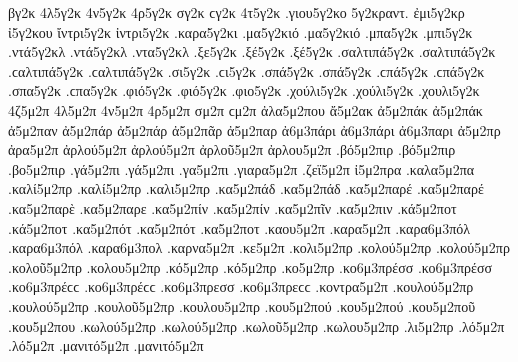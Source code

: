 {%
βγ2κ
4λ5γ2κ
4ν5γ2κ
4ρ5γ2κ
σγ2κ ϲγ2κ
4τ5γ2κ
.γιου5γ2κο   %
5γ2κραντ.   %
ἐμι5γ2κρ   %
ἰ5γ2κου   %
ἴντρι5γ2κ   %
ἰντρι5γ2κ
.καρα5γ2κι   %
.μα5γ2κιό .μα5γ2κιό   %
.μπα5γ2κ   %
.μπι5γ2κ   %
.ντά5γ2κλ .ντά5γ2κλ   %
.ντα5γ2κλ   %
.ξε5γ2κ   %
.ξέ5γ2κ .ξέ5γ2κ
.σαλτιπά5γ2κ .σαλτιπά5γ2κ .ϲαλτιπά5γ2κ .ϲαλτιπά5γ2κ   %
.σι5γ2κ .ϲι5γ2κ   %
.σπά5γ2κ .σπά5γ2κ .ϲπά5γ2κ .ϲπά5γ2κ   %
.σπα5γ2κ .ϲπα5γ2κ
.φιό5γ2κ .φιό5γ2κ   %
.φιο5γ2κ
.χούλι5γ2κ .χούλι5γ2κ   %
.χουλι5γ2κ
4ζ5μ2π
4λ5μ2π
4ν5μ2π
4ρ5μ2π
σμ2π ϲμ2π
ἀλα5μ2που   %
ἄ5μ2ακ   %
ἀ5μ2πάκ ἀ5μ2πάκ
ἀ5μ2παν   %
ἀ5μ2πάρ ἀ5μ2πάρ   %
ἀ5μ2πᾶρ
ἀ5μ2παρ
ἀ6μ3πάρι ἀ6μ3πάρι   %
ἀ6μ3παρι
ἀ5μ2πρ   %
ἀρα5μ2π   %
ἀρλού5μ2π ἀρλού5μ2π   %
ἀρλοῦ5μ2π
ἀρλου5μ2π
.βό5μ2πιρ .βό5μ2πιρ   %
.βο5μ2πιρ   %
.γά5μ2πι .γά5μ2πι   %
.γα5μ2πι
.γιαρα5μ2π   %
.ζεϊ5μ2π   %
ἰ5μ2πρα   %
.καλα5μ2πα   %
.καλί5μ2πρ .καλί5μ2πρ   %
.καλι5μ2πρ
.κα5μ2πάδ .κα5μ2πάδ   %
.κα5μ2παρέ .κα5μ2παρέ   %
.κα5μ2παρὲ
.κα5μ2παρε
.κα5μ2πίν .κα5μ2πίν   %
.κα5μ2πῖν
.κα5μ2πιν
.κά5μ2ποτ .κά5μ2ποτ   %
.κα5μ2πότ .κα5μ2πότ
.κα5μ2ποτ
.καου5μ2π   %
.καρα5μ2π   %
.καρα6μ3πόλ .καρα6μ3πόλ   %
.καρα6μ3πολ
.καρνα5μ2π   %
.κε5μ2π   %
.κολι5μ2πρ   %
.κολού5μ2πρ .κολού5μ2πρ   %
.κολοῦ5μ2πρ
.κολου5μ2πρ
.κό5μ2πρ .κό5μ2πρ   %
.κο5μ2πρ
.κο6μ3πρέσσ .κο6μ3πρέσσ .κο6μ3πρέϲϲ .κο6μ3πρέϲϲ   %
.κο6μ3πρεσσ .κο6μ3πρεϲϲ
.κοντρα5μ2π   %
.κουλού5μ2πρ .κουλού5μ2πρ   %
.κουλοῦ5μ2πρ
.κουλου5μ2πρ
.κου5μ2πού .κου5μ2πού   %
.κου5μ2ποῦ
.κου5μ2που
.κωλού5μ2πρ .κωλού5μ2πρ   %
.κωλοῦ5μ2πρ
.κωλου5μ2πρ
.λι5μ2πρ   %
.λό5μ2π .λό5μ2π   %
.μανιτό5μ2π .μανιτό5μ2π   %
}
